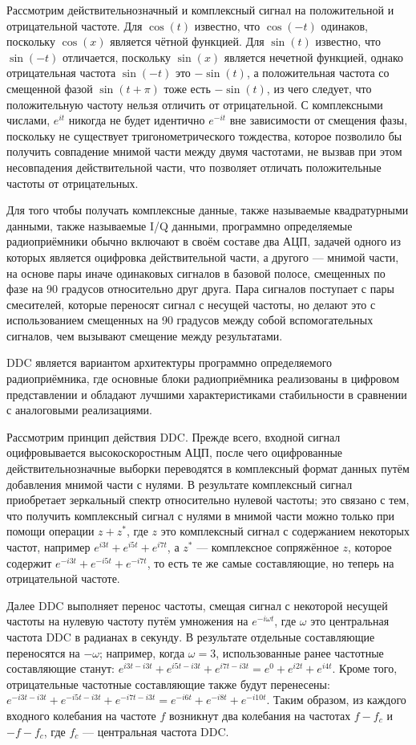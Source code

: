 \documentclass{report}
\begin{document}
Рассмотрим действительнозначный и комплексный сигнал на положительной и отрицательной частоте. Для $\cos(t)$ известно, что $\cos(-t)$ одинаков, поскольку $\cos(x)$ является чётной функцией. Для $\sin(t)$ известно, что $\sin(-t)$ отличается, поскольку $\sin(x)$ является нечетной функцией, однако отрицательная частота $\sin(-t)$ это $-\sin(t)$, а положительная частота со смещенной фазой $\sin(t + \pi)$ тоже есть $-\sin(t)$, из чего следует, что положительную частоту нельзя отличить от отрицательной. С комплексными числами, $e^{it}$ никогда не будет идентично $e^{-it}$ вне зависимости от смещения фазы, поскольку не существует тригонометрического тождества, которое позволило бы получить совпадение мнимой части между двумя частотами, не вызвав при этом несовпадения действительной части, что позволяет отличать положительные частоты от отрицательных.

Для того чтобы получать комплексные данные, также называемые квадратурными данными, также называемые I/Q данными, программно определяемые радиоприёмники обычно включают в своём составе два АЦП, задачей одного из которых является оцифровка действительной части, а другого --- мнимой части, на основе пары иначе одинаковых сигналов в базовой полосе, смещенных по фазе на 90 градусов относительно друг друга. Пара сигналов поступает с пары смесителей, которые переносят сигнал с несущей частоты, но делают это с использованием смещенных на 90 градусов между собой вспомогательных сигналов, чем вызывают смещение между результатами.

DDC является вариантом архитектуры программно определяемого радиоприёмника, где основные блоки радиоприёмника реализованы в цифровом представлении и обладают лучшими характеристиками стабильности в сравнении с аналоговыми реализациями.

Рассмотрим принцип действия DDC. Прежде всего, входной сигнал оцифровывается высокоскоростным АЦП, после чего оцифрованные действительнозначные выборки переводятся в комплексный формат данных путём добавления мнимой части с нулями. В результате комплексный сигнал приобретает зеркальный спектр относительно нулевой частоты; это связано с тем, что получить комплексный сигнал с нулями в мнимой части можно только при помощи операции $z + z^*$, где $z$ это комплексный сигнал с содержанием некоторых частот, например $e^{i3t} + e^{i5t} + e^{i7t}$, а $z^*$ --- комплексное сопряжённое $z$, которое содержит $e^{-i3t} + e^{-i5t} + e^{-i7t}$, то есть те же самые составляющие, но теперь на отрицательной частоте.

Далее DDC выполняет перенос частоты, смещая сигнал с некоторой несущей частоты на нулевую частоту путём умножения на $e^{-i \omega t}$, где $\omega$ это центральная частота DDC в радианах в секунду. В результате отдельные составляющие переносятся на $-\omega$; например, когда $\omega=3$, использованные ранее частотные составляющие станут: $e^{i3t - i3t} + e^{i5t - i3t} + e^{i7t - i3t} = e^{0} + e^{i2t} + e^{i4t}$. Кроме того, отрицательные частотные составляющие также будут перенесены: $e^{-i3t - i3t} + e^{-i5t - i3t} + e^{-i7t - i3t} = e^{-i6t} + e^{-i8t} + e^{-i10t}$. Таким образом, из каждого входного колебания на частоте $f$ возникнут два колебания на частотах $f - f_c$ и $-f -f_c$, где $f_c$ --- центральная частота DDC.
\end{document}
